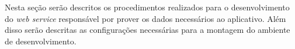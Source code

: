 
	\par Nesta seção serão descritos os procedimentos realizados para o
desenvolvimento do \textit{web service} responsável por prover os dados
necessários ao aplicativo. Além disso serão descritas as configurações
necessárias para a montagem do ambiente de desenvolvimento.